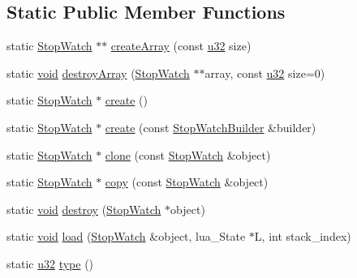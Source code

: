 \subsection*{Static Public Member Functions}
\begin{DoxyCompactItemize}
\item 
static \mbox{\hyperlink{classnjli_1_1_stop_watch}{Stop\+Watch}} $\ast$$\ast$ \mbox{\hyperlink{classnjli_1_1_stop_watch_ab3ca2ba06be2e649b3d68e3582a24606}{create\+Array}} (const \mbox{\hyperlink{_util_8h_a10e94b422ef0c20dcdec20d31a1f5049}{u32}} size)
\item 
static \mbox{\hyperlink{_thread_8h_af1e856da2e658414cb2456cb6f7ebc66}{void}} \mbox{\hyperlink{classnjli_1_1_stop_watch_a606c409e3940aea9d90bca5037eb2227}{destroy\+Array}} (\mbox{\hyperlink{classnjli_1_1_stop_watch}{Stop\+Watch}} $\ast$$\ast$array, const \mbox{\hyperlink{_util_8h_a10e94b422ef0c20dcdec20d31a1f5049}{u32}} size=0)
\item 
static \mbox{\hyperlink{classnjli_1_1_stop_watch}{Stop\+Watch}} $\ast$ \mbox{\hyperlink{classnjli_1_1_stop_watch_a017e60bda148ff2282d0947b2181a4f8}{create}} ()
\item 
static \mbox{\hyperlink{classnjli_1_1_stop_watch}{Stop\+Watch}} $\ast$ \mbox{\hyperlink{classnjli_1_1_stop_watch_ae55b126fe41dfe7274b2bec706993738}{create}} (const \mbox{\hyperlink{classnjli_1_1_stop_watch_builder}{Stop\+Watch\+Builder}} \&builder)
\item 
static \mbox{\hyperlink{classnjli_1_1_stop_watch}{Stop\+Watch}} $\ast$ \mbox{\hyperlink{classnjli_1_1_stop_watch_a89592642454c69b7de06a272f56a8dd3}{clone}} (const \mbox{\hyperlink{classnjli_1_1_stop_watch}{Stop\+Watch}} \&object)
\item 
static \mbox{\hyperlink{classnjli_1_1_stop_watch}{Stop\+Watch}} $\ast$ \mbox{\hyperlink{classnjli_1_1_stop_watch_a828bdc3414c97fa1537416548dffc803}{copy}} (const \mbox{\hyperlink{classnjli_1_1_stop_watch}{Stop\+Watch}} \&object)
\item 
static \mbox{\hyperlink{_thread_8h_af1e856da2e658414cb2456cb6f7ebc66}{void}} \mbox{\hyperlink{classnjli_1_1_stop_watch_aebb1a654fc268b038e1f48649e796fd7}{destroy}} (\mbox{\hyperlink{classnjli_1_1_stop_watch}{Stop\+Watch}} $\ast$object)
\item 
static \mbox{\hyperlink{_thread_8h_af1e856da2e658414cb2456cb6f7ebc66}{void}} \mbox{\hyperlink{classnjli_1_1_stop_watch_af8576ae6a5bfa890c35c6cddedd62e57}{load}} (\mbox{\hyperlink{classnjli_1_1_stop_watch}{Stop\+Watch}} \&object, lua\+\_\+\+State $\ast$L, int stack\+\_\+index)
\item 
static \mbox{\hyperlink{_util_8h_a10e94b422ef0c20dcdec20d31a1f5049}{u32}} \mbox{\hyperlink{classnjli_1_1_stop_watch_ae0c8a96a7465847dd0b739f307ca71c6}{type}} ()
\end{DoxyCompactItemize}
